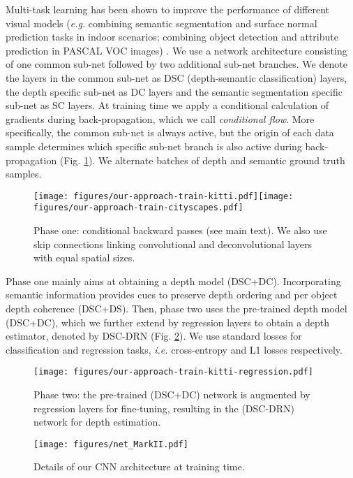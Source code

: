 \documentclass[letterpaper, 10 pt, conference]{ieeeconf}
\newcommand{\ie}{{\em i.e.}}
\newcommand{\eg}{{\em e.g.}}
\newcommand{\Fig}[1]{Fig. \ref{fig:#1}}
\begin{document}
Multi-task learning has been shown to improve the performance of different visual models ({\eg} combining semantic segmentation and surface normal prediction tasks in indoor scenarios; combining object detection and attribute prediction in PASCAL VOC images) \cite{Misra:2016}. We use a network architecture consisting of one common sub-net followed by two additional sub-net branches. We denote the layers in the common sub-net as DSC (depth-semantic classification) layers, the depth specific sub-net as DC layers and the semantic segmentation specific sub-net as SC layers. At training time we apply a conditional calculation of gradients during back-propagation, which we call \emph{conditional flow}. More specifically, the common sub-net is always active, but the origin of each data sample determines which specific sub-net branch is also active during back-propagation (\Fig{Net_Arch}). We alternate batches of depth and semantic ground truth samples.
\begin{figure}[t!]
	\centering
	\texttt{[image: figures/our-approach-train-kitti.pdf]}\hspace{0.04\columnwidth}\texttt{[image: figures/our-approach-train-cityscapes.pdf]}
	\caption{Phase one: conditional backward passes (see main text). We also use skip connections linking convolutional and deconvolutional layers with equal spatial sizes.}
	\label{fig:Net_Arch}
\end{figure}


Phase one mainly aims at obtaining a depth model (DSC+DC). Incorporating semantic information provides cues to preserve depth ordering and per object depth coherence (DSC+DS). Then, phase two uses the pre-trained depth model (DSC+DC), which we further extend by regression layers to obtain a depth estimator, denoted by DSC-DRN (\Fig{Net_Arch-regression}). We use standard losses for classification and regression tasks, {\ie} cross-entropy and L1 losses respectively.
 


\begin{figure}[t!]
	\centering
	\texttt{[image: figures/our-approach-train-kitti-regression.pdf]}
	\caption{Phase two: the pre-trained (DSC+DC) network is augmented by regression layers for fine-tuning, resulting in the (DSC-DRN) network for depth estimation.}
	\label{fig:Net_Arch-regression}
\end{figure}

\begin{figure*}
	\centering
	\texttt{[image: figures/net\_MarkII.pdf]}
\caption{Details of our CNN architecture at training time.}
	\label{fig:Net_arch_}
\end{figure*}
\end{document}
